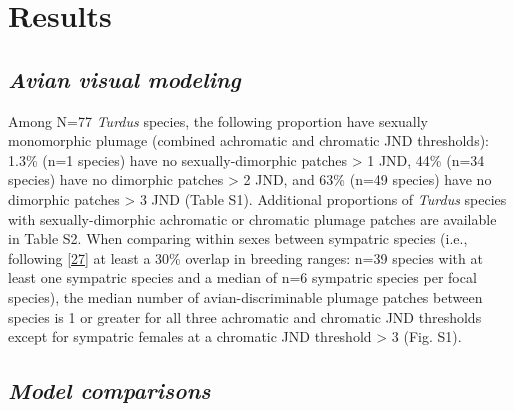 \documentclass[
  a4paper,
]{article}
\begin{document}
\hypertarget{results}{%
\section{Results}\label{results}}

\hypertarget{avian-visual-modeling}{%
\subsection{\texorpdfstring{\emph{Avian visual
modeling}}{Avian visual modeling}}\label{avian-visual-modeling}}

Among N=77 \emph{Turdus} species, the following proportion have sexually
monomorphic plumage (combined achromatic and chromatic JND thresholds):
1.3\% (n=1 species) have no sexually-dimorphic patches \textgreater{} 1
JND, 44\% (n=34 species) have no dimorphic patches \textgreater{} 2 JND,
and 63\% (n=49 species) have no dimorphic patches \textgreater{} 3 JND
(Table S1). Additional proportions of \emph{Turdus} species with
sexually-dimorphic achromatic or chromatic plumage patches are available
in Table S2. When comparing within sexes between sympatric species
(i.e., following {[}\protect\hyperlink{ref-cooney2017}{27}{]} at least a
30\% overlap in breeding ranges: n=39 species with at least one
sympatric species and a median of n=6 sympatric species per focal
species), the median number of avian-discriminable plumage patches
between species is 1 or greater for all three achromatic and chromatic
JND thresholds except for sympatric females at a chromatic JND threshold
\textgreater{} 3 (Fig. S1).

\hypertarget{model-comparisons}{%
\subsection{\texorpdfstring{\emph{Model
comparisons}}{Model comparisons}}\label{model-comparisons}}
\end{document}
